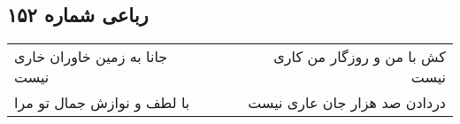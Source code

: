 \begin{center}
\section*{رباعی شماره ۱۵۲}
\label{sec:sh152}
\begin{longtable}{l p{0.5cm} r}
جانا به زمین خاوران خاری نیست
&&
کش با من و روزگار من کاری نیست
\\
با لطف و نوازش جمال تو مرا
&&
دردادن صد هزار جان عاری نیست
\\
\end{longtable}
\end{center}
